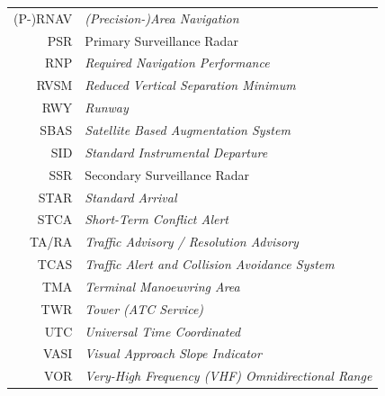 \begin{table}[!hbtp]
\begin{center}
\begin{tabular}{r l}
		(P-)RNAV	& \textit{(Precision-)Area Navigation} \\	
		PSR 	& Primary Surveillance Radar \\			
		RNP		& \textit{Required Navigation Performance} \\
		RVSM	& \textit{Reduced Vertical Separation Minimum} \\
		RWY		& \textit{Runway} \\
		SBAS	& \textit{Satellite Based Augmentation System} \\
		SID		& \textit{Standard Instrumental Departure} \\
		SSR 	& Secondary Surveillance Radar \\
		STAR	& \textit{Standard Arrival} \\
		STCA	& \textit{Short-Term Conflict Alert} \\		
		TA/RA	& \textit{Traffic Advisory / Resolution Advisory} \\
		TCAS	& \textit{Traffic Alert and Collision Avoidance System} \\		
		TMA		& \textit{Terminal Manoeuvring Area} \\
		TWR		& \textit{Tower (ATC Service)} \\	
		UTC		& \textit{Universal Time Coordinated} \\
		VASI	& \textit{Visual Approach Slope Indicator} \\
		VOR		& \textit{Very-High Frequency (VHF) Omnidirectional Range} \\							
		\end{tabular}
	\end{center}
\end{table}

\clearpage
